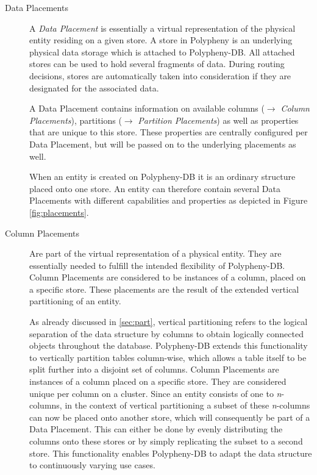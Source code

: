 \begin{description}
    \item [Data Placements] A \emph{Data Placement} is essentially a virtual representation of the physical entity residing on a given store.
    A store in Polypheny is an underlying physical data storage which is attached to Polypheny-DB.
    All attached stores can be used to hold several fragments of data. 
    During routing decisions, stores are automatically taken into consideration if they are designated for the associated data.
    
    A Data Placement contains information on available columns ($\rightarrow$ \emph{Column Placements}), partitions ($\rightarrow$ \emph{Partition Placements})
    as well as properties that are unique to this store. These properties are centrally configured per Data Placement, but will be passed on to the underlying placements as well.
    
    When an entity is created on Polypheny-DB it is an ordinary structure placed onto one store.
    An entity can therefore contain several Data Placements with different capabilities and properties as depicted in Figure \ref{fig:placements}. 
    
    

    \item [Column Placements]
    Are part of the virtual representation of a physical entity. They are essentially needed to fulfill the intended flexibility of Polypheny-DB. 
    Column Placements are considered to be instances of a column, placed on a specific store.
    These placements are the result of the extended vertical partitioning of an entity.


    As already discussed in \ref{sec:part}, vertical partitioning refers to the logical 
    separation of the data structure by columns to obtain logically connected objects throughout 
    the database. Polypheny-DB extends this functionality to vertically partition tables
    column-wise, which allows a table itself to be split further into a disjoint 
    set of columns.
    Column Placements are instances of a column placed on a specific store.
    They are considered unique per column on a cluster.
    Since an entity consists of one to \textit{n}-columns,
    in the context of vertical partitioning a subset of these \textit{n}-columns can now 
    be placed onto another store, which will consequently be part of a Data Placement.
    This can either be done by evenly distributing the columns onto these stores 
    or by simply replicating the subset to a second store.
    This functionality enables Polypheny-DB to adapt the data structure to continuously 
    varying use cases.\\


\end{description}
